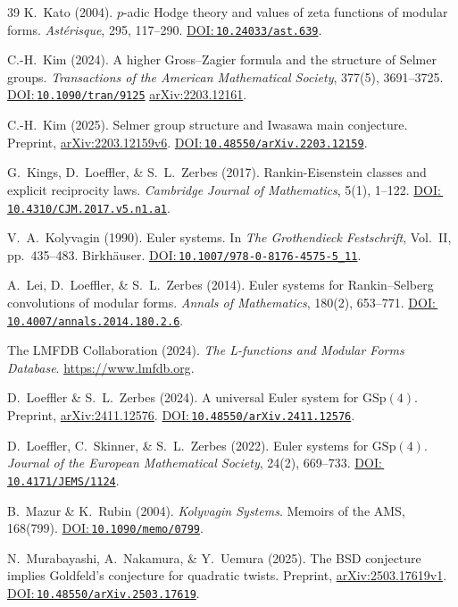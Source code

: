 \documentclass[aps,prd,twocolumn,superscriptaddress,nofootinbib,floatfix]{revtex4-2}
\newcommand{\doilink}[1]{\href{https://doi.org/#1}{DOI:\,\nolinkurl{#1}}}
\theoremstyle{definition}
\theoremstyle{remark}
\begin{document}
\begin{thebibliography}{39}
K.~Kato (2004).
$p$-adic Hodge theory and values of zeta functions of modular forms.
\textit{Astérisque}, 295, 117--290.
\doilink{10.24033/ast.639}.

C.-H.~Kim (2024).
A higher Gross--Zagier formula and the structure of Selmer groups.
\textit{Transactions of the American Mathematical Society}, 377(5), 3691--3725.
\doilink{10.1090/tran/9125} \href{https://arxiv.org/abs/2203.12161}{arXiv:2203.12161}.

C.-H.~Kim (2025).
Selmer group structure and Iwasawa main conjecture.
Preprint, \href{https://arxiv.org/abs/2203.12159v6}{arXiv:2203.12159v6}.
\doilink{10.48550/arXiv.2203.12159}.

G.~Kings, D.~Loeffler, \& S.~L.~Zerbes (2017).
Rankin-Eisenstein classes and explicit reciprocity laws.
\textit{Cambridge Journal of Mathematics}, 5(1), 1--122.
\doilink{10.4310/CJM.2017.v5.n1.a1}.

V.~A.~Kolyvagin (1990).
Euler systems.
In \textit{The Grothendieck Festschrift}, Vol.~II, pp.\ 435--483. Birkhäuser.
\doilink{10.1007/978-0-8176-4575-5\_11}.

A.~Lei, D.~Loeffler, \& S.~L.~Zerbes (2014).
Euler systems for Rankin--Selberg convolutions of modular forms.
\textit{Annals of Mathematics}, 180(2), 653--771.
\doilink{10.4007/annals.2014.180.2.6}.

The LMFDB Collaboration (2024).
\textit{The L-functions and Modular Forms Database}.
\url{https://www.lmfdb.org}.

D.~Loeffler \& S.~L.~Zerbes (2024).
A universal Euler system for $\mathrm{GSp}(4)$.
Preprint, \href{https://arxiv.org/abs/2411.12576}{arXiv:2411.12576}.
\doilink{10.48550/arXiv.2411.12576}.

D.~Loeffler, C.~Skinner, \& S.~L.~Zerbes (2022).
Euler systems for $\mathrm{GSp}(4)$.
\textit{Journal of the European Mathematical Society}, 24(2), 669--733.
\doilink{10.4171/JEMS/1124}.

B.~Mazur \& K.~Rubin (2004).
\textit{Kolyvagin Systems}.
Memoirs of the AMS, 168(799).
\doilink{10.1090/memo/0799}.

N.~Murabayashi, A.~Nakamura, \& Y.~Uemura (2025).
The BSD conjecture implies Goldfeld's conjecture for quadratic twists.
Preprint, \href{https://arxiv.org/abs/2503.17619v1}{arXiv:2503.17619v1}.
\doilink{10.48550/arXiv.2503.17619}.


\end{thebibliography}
\end{document}
